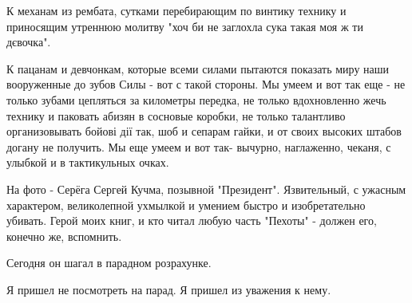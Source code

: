 К механам из рембата, сутками перебирающим по винтику технику и приносящим
утреннюю молитву "хоч би не заглохла сука такая моя ж ти дєвочка". 

К пацанам и девчонкам, которые всеми силами пытаются показать миру наши
вооруженные до зубов Силы - вот с такой стороны. Мы умеем и вот так еще - не
только зубами цепляться за километры передка, не только вдохновленно жечь
технику и паковать абизян в сосновые коробки, не только талантливо
организовывать бойові дії так, шоб и сепарам гайки, и от своих высоких штабов
догану не получить. Мы еще умеем и вот так- вычурно, наглаженно, чеканя, с
улыбкой и в тактикульных очках. 

На фото - Серёга Сергей Кучма, позывной "Президент". Язвительный, с ужасным
характером, великолепной ухмылкой и умением быстро и изобретательно убивать.
Герой моих книг, и кто читал любую часть "Пехоты" - должен его, конечно же,
вспомнить. 

Сегодня он шагал в парадном розрахунке. 

Я пришел не посмотреть на парад. Я пришел из уважения к нему.
